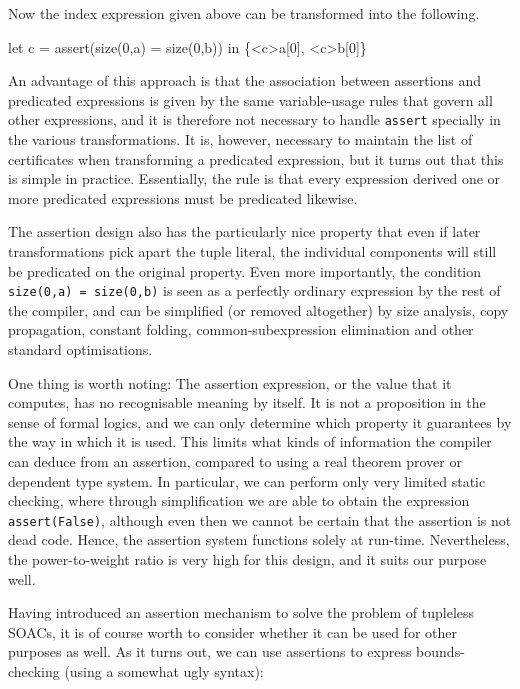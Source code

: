 Now the index expression given above can be transformed into the
following.

\begin{colorcode}
let c = assert(size(0,a) = size(0,b)) in
\{<c>a[0], <c>b[0]\}
\end{colorcode}

An advantage of this approach is that the association between
assertions and predicated expressions is given by the same
variable-usage rules that govern all other expressions, and it is
therefore not necessary to handle \texttt{assert} specially in the
various transformations.  It is, however, necessary to maintain the
list of certificates when transforming a predicated expression, but it
turns out that this is simple in practice.  Essentially, the rule is
that every expression derived one or more predicated expressions must
be predicated likewise.

The assertion design also has the particularly nice property that even
if later transformations pick apart the tuple literal, the individual
components will still be predicated on the original property.  Even
more importantly, the condition \texttt{size(0,a) = size(0,b)} is seen
as a perfectly ordinary expression by the rest of the compiler, and
can be simplified (or removed altogether) by size analysis, copy
propagation, constant folding, common-subexpression elimination and
other standard optimisations.

One thing is worth noting: The assertion expression, or the value that
it computes, has no recognisable meaning by itself.  It is not a
proposition in the sense of formal logics, and we can only determine
which property it guarantees by the way in which it is used.  This
limits what kinds of information the compiler can deduce from an
assertion, compared to using a real theorem prover or dependent type
system.  In particular, we can perform only very limited static
checking, where through simplification we are able to obtain the
expression \texttt{assert(False)}, although even then we cannot be
certain that the assertion is not dead code.  Hence, the assertion
system functions solely at run-time.  Nevertheless, the
power-to-weight ratio is very high for this design, and it suits our
purpose well.

Having introduced an assertion mechanism to solve the problem of
tupleless SOACs, it is of course worth to consider whether it can be
used for other purposes as well.  As it turns out, we can use
assertions to express bounds-checking (using a somewhat ugly syntax):

